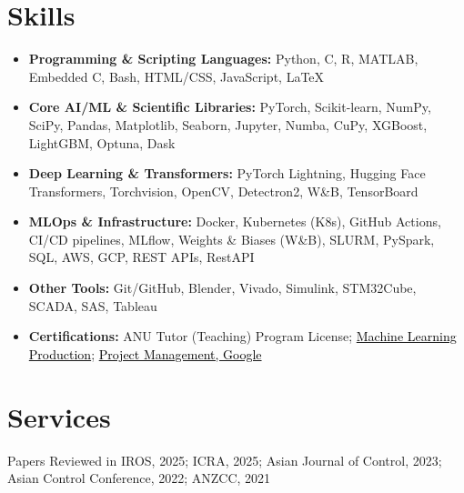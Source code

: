 \documentclass[10pt, a4paper, sans]{moderncv}
\begin{document}
%
%
\vspace{-0.5em}
\section*{Skills}
\begin{itemize}[leftmargin=*, itemsep=0em]
    \item \textbf{Programming \& Scripting Languages:} Python, C, R, MATLAB, Embedded C, Bash, HTML/CSS, JavaScript, \LaTeX
    \item \textbf{Core AI/ML \& Scientific Libraries:} PyTorch, Scikit-learn, NumPy, SciPy, Pandas, Matplotlib, Seaborn, Jupyter, Numba, CuPy, XGBoost, LightGBM, Optuna, Dask
    \item \textbf{Deep Learning \& Transformers:} PyTorch Lightning, Hugging Face Transformers, Torchvision, OpenCV, Detectron2, W\&B, TensorBoard
    \item \textbf{MLOps \& Infrastructure:} Docker, Kubernetes (K8s), GitHub Actions, CI/CD pipelines, MLflow, Weights \& Biases (W\&B), SLURM, PySpark, SQL, AWS, GCP, REST APIs, RestAPI
    \item \textbf{Other Tools:} Git/GitHub, Blender, Vivado, Simulink, STM32Cube, SCADA, SAS, Tableau
    \item \textbf{Certifications:} ANU Tutor (Teaching) Program License; \href{https://coursera.org/share/8204c8b2ca3d84b7fccec7d44edaa8b7}{\textcolor{black}{Machine Learning Production}}; \href{https://www.coursera.org/account/accomplishments/certificate/JZCYF4MAB3CX}{\textcolor{black}{Project Management, Google}}
\end{itemize}
\vspace{-1em}
\section*{Services}
Papers Reviewed in IROS, 2025; ICRA, 2025; Asian Journal of Control, 2023; Asian Control Conference, 2022; ANZCC, 2021
\end{document}

